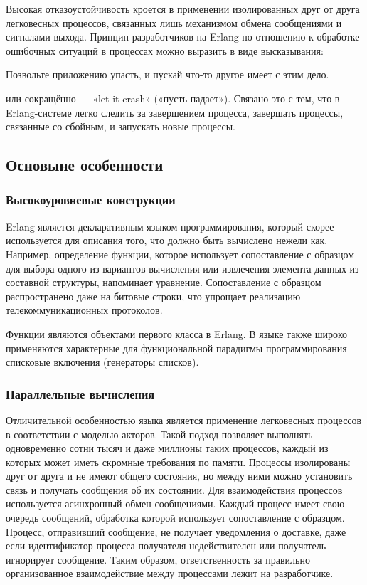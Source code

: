 \documentclass[12pt]{article}
\begin{document}
Высокая отказоустойчивость кроется в применении изолированных друг от друга легковесных процессов, связанных лишь механизмом обмена сообщениями и сигналами выхода. Принцип разработчиков на Erlang по отношению к обработке ошибочных ситуаций в процессах можно выразить в виде высказывания:

\begin{displayquote}
Позвольте приложению упасть, и пускай что-то другое имеет с этим дело.
\end{displayquote}

или сокращённо — «let it crash» («пусть падает»). Связано это с тем, что в Erlang-системе легко следить за завершением процесса, завершать процессы, связанные со сбойным, и запускать новые процессы.

\subsection*{Основыне особенности}
\subsubsection*{Высокоуровневые конструкции}
Erlang является декларативным языком программирования, который скорее используется для описания того, что должно быть вычислено нежели как. Например, определение функции, которое использует сопоставление с образцом для выбора одного из вариантов вычисления или извлечения элемента данных из составной структуры, напоминает уравнение. Сопоставление с образцом распространено даже на битовые строки, что упрощает реализацию телекоммуникационных протоколов.

Функции являются объектами первого класса в Erlang. В языке также широко применяются характерные для функциональной парадигмы программирования списковые включения (генераторы списков).

\subsubsection*{Параллельные вычисления}
Отличительной особенностью языка является применение легковесных процессов в соответствии с моделью акторов. Такой подход позволяет выполнять одновременно сотни тысяч и даже миллионы таких процессов, каждый из которых может иметь скромные требования по памяти. Процессы изолированы друг от друга и не имеют общего состояния, но между ними можно установить связь и получать сообщения об их состоянии. Для взаимодействия процессов используется асинхронный обмен сообщениями. Каждый процесс имеет свою очередь сообщений, обработка которой использует сопоставление с образцом. Процесс, отправивший сообщение, не получает уведомления о доставке, даже если идентификатор процесса-получателя недействителен или получатель игнорирует сообщение. Таким образом, ответственность за правильно организованное взаимодействие между процессами лежит на разработчике.
\end{document}
